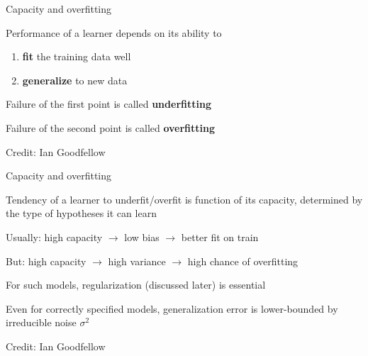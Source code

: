 \documentclass[11pt,compress,t,notes=noshow, xcolor=table]{beamer}
\begin{document}
\begin{framei}[sep=L]{Capacity and overfitting}

\item Performance of a learner depends on its ability to 
\begin{enumerate}
\item \textbf{fit} the training data well
\item \textbf{generalize} to new data
\end{enumerate}  
\item Failure of the first point is called \textbf{underfitting}
\item Failure of the second point is called \textbf{overfitting}

\tiny \centering
Credit: Ian Goodfellow

\end{framei}

\begin{framei}[sep=M]{Capacity and overfitting}

\item Tendency of a learner to underfit/overfit is function of its capacity, determined by the type of hypotheses it can learn
\item Usually: high capacity $\rightarrow$ low bias $\rightarrow$ better fit on train
\item But: high capacity $\rightarrow$ high variance $\rightarrow$ high chance of overfitting
\item For such models, regularization (discussed later) is essential
\item Even for correctly specified models, generalization error is lower-bounded by irreducible noise $\sigma^2$

\tiny \centering
Credit: Ian Goodfellow

\end{framei}

\endlecture
\end{document}
